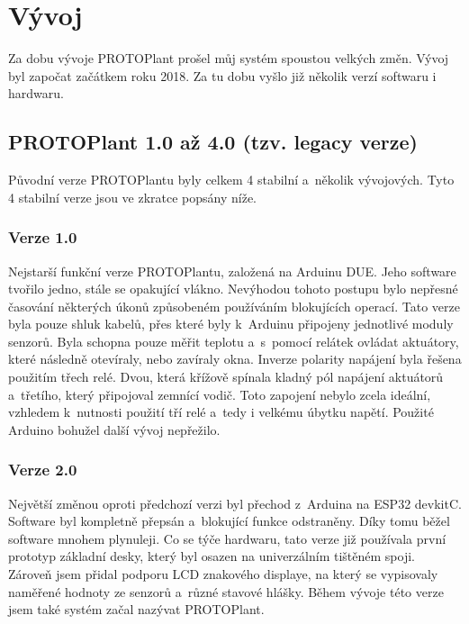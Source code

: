 \chapter{Vývoj}
Za dobu vývoje PROTOPlant prošel můj systém spoustou velkých změn.
Vývoj byl započat začátkem roku 2018.
Za tu dobu vyšlo již několik verzí softwaru i hardwaru.

\section{PROTOPlant 1.0 až 4.0 (tzv. legacy verze)}
Původní verze PROTOPlantu byly celkem 4 stabilní a~několik vývojových.
Tyto 4 stabilní verze jsou ve zkratce popsány níže.

\subsection{Verze 1.0}
Nejstarší funkční verze PROTOPlantu, založená na Arduinu DUE. 
Jeho software tvořilo jedno, stále se opakující vlákno.
Nevýhodou tohoto postupu bylo nepřesné časování některých úkonů způsobeném používáním blokujících operací.
Tato verze byla pouze shluk kabelů, přes které byly k~Arduinu připojeny jednotlivé moduly senzorů.
Byla schopna pouze měřit teplotu a~s~pomocí relátek ovládat aktuátory, které následně otevíraly, nebo zavíraly okna.
Inverze polarity napájení byla řešena použitím třech relé.
Dvou, která křížově spínala kladný pól napájení aktuátorů a~třetího, který připojoval zemnící vodič.
Toto zapojení nebylo zcela ideální, vzhledem k~nutnosti použití tří relé a~tedy i velkému úbytku napětí.
Použité Arduino bohužel další vývoj nepřežilo.

\subsection{Verze 2.0}
Největší změnou oproti předchozí verzi byl přechod z~Arduina na ESP32 devkitC.
Software byl kompletně přepsán a~blokující funkce odstraněny.
Díky tomu běžel software mnohem plynuleji.
Co se týče hardwaru, tato verze již používala první prototyp základní desky, který byl osazen na univerzálním tištěném spoji.
Zároveň jsem přidal podporu LCD znakového displaye, na který se vypisovaly naměřené hodnoty ze senzorů a~různé stavové hlášky.
Během vývoje této verze jsem také systém začal nazývat PROTOPlant.

